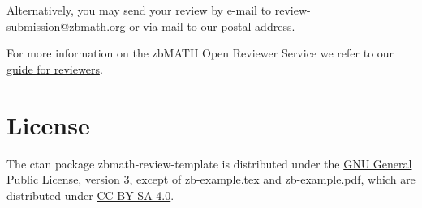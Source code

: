 \documentclass{zbMATH}
\begin{document}
Alternatively, you may send your review by e-mail to review-submission@zbmath.org or via mail to our \href{https://zbmath.org/contact/}{postal address}.

For more information on the zbMATH Open Reviewer Service we refer to our \href{https://zbmath.org/reviewer-service/info_texts/guide_for_reviewers}{guide for reviewers}.

\section*{License}

The ctan package zbmath-review-template is distributed under the \href{https://www.gnu.org/licenses/gpl-3.0.en.html}{GNU General Public License, version 3}, except of zb-example.tex and zb-example.pdf, which are distributed under \href{https://creativecommons.org/licenses/by-sa/4.0/}{CC-BY-SA 4.0}.
\end{document}

